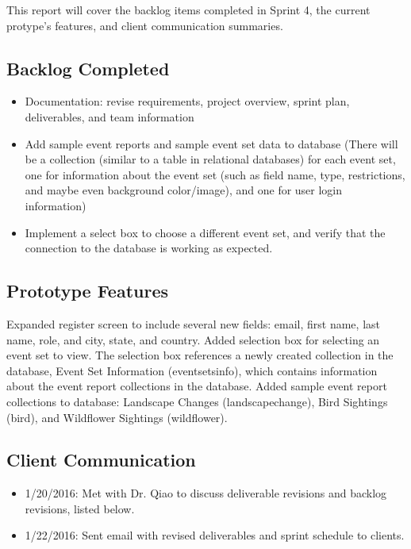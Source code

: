 
This report will cover the backlog items completed in Sprint 4, the current protype's features, and client communication summaries. 

 \subsection{Backlog Completed}
\begin{itemize}
\item Documentation: revise requirements, project overview, sprint plan, deliverables, and team information
\item Add sample event reports and sample event set data to database (There will be a collection (similar to a table in relational databases) for each event set, one for information about the event set (such as field name, type, restrictions, and maybe even background color/image), and one for user login information) 
\item Implement a select box to choose a different event set, and verify that the connection to the database is working as expected.
\end{itemize}
 
 \subsection{Prototype Features}
 Expanded register screen to include several new fields: email, first name, last name, role, and city, state, and country.  Added selection box for selecting an event set to view. The selection box references a newly created collection in the database, Event Set Information (eventsetsinfo), which contains information about the event report collections in the database. Added sample event report collections to database: Landscape Changes (landscapechange), Bird Sightings (bird), and Wildflower Sightings (wildflower).


\subsection{Client Communication}
\begin{itemize}
\item 1/20/2016: Met with Dr. Qiao to discuss deliverable revisions and backlog revisions, listed below.
\item 1/22/2016: Sent email with revised deliverables and sprint schedule to clients.
\end{itemize}


